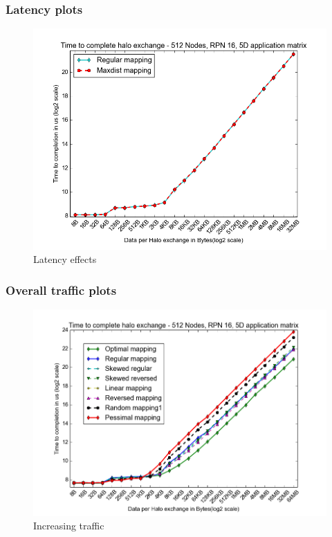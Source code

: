 \documentclass{beamer}
\begin{document}
\begin{frame}
\frametitle{Latency plots}
\begin{figure}
\caption{Latency effects}
\includegraphics[width=0.8\linewidth]{../regular_vs_maxdist.png}
\end{figure}
\end{frame}

\begin{frame}
\frametitle{Overall traffic plots}
\begin{figure}
\caption{Increasing traffic}
\includegraphics[width=0.8\linewidth]{../3D_512_all_mappings.png}
\end{figure}
\end{frame}
\end{document}

